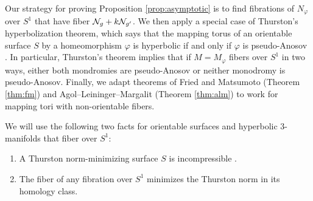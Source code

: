 Our strategy for proving Proposition \ref{prop:asymptotic} is to find fibrations of $N_{\varphi}$ over $S^1$ that have fiber $\mathcal{N}_g+k\mathcal{N}_{g'}$.  We then apply a special case of Thurston's hyperbolization theorem, which says that the mapping torus of an orientable surface $S$ by a homeomorphism $\varphi$ is hyperbolic if and only if $\varphi$ is pseudo-Anosov \cite[Theorem 0.1]{thurston_hyp}.  In particular, Thurston's theorem implies that if $M=M_\varphi$ fibers over $S^1$ in two ways, either both mondromies are pseudo-Anosov or neither monodromy is pseudo-Anosov.  Finally, we adapt theorems of Fried and Matsumoto (Theorem \ref{thm:fm}) and Agol--Leininger--Margalit (Theorem \ref{thm:alm}) to work for mapping tori with non-orientable fibers.


\medskip
We will use the following two facts for orientable surfaces and hyperbolic 3-manifolds that fiber over $S^1$:
\begin{enumerate}
 \item A Thurston norm-minimizing surface $S$ is incompressible \cite[Lemma 5.7]{calegari2007foliations}.
\item  The fiber of any fibration over $S^1$ minimizes the Thurston norm in its homology class.
\end{enumerate}





